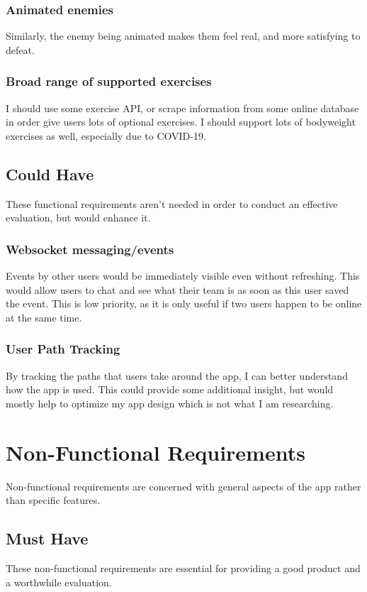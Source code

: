 \documentclass{l4proj}
\begin{document}
  \subsubsection{Animated enemies}
  Similarly, the enemy being animated makes them feel real, and more satisfying to defeat. 

  \subsubsection{Broad range of supported exercises}
  I should use some exercise API, or scrape information from some online database in order give users lots of optional exercises. I should support lots of bodyweight exercises as well, especially due to COVID-19.

\subsection{Could Have}
  These functional requirements aren't needed in order to conduct an effective evaluation, but would enhance it. 
\subsubsection{Websocket messaging/events}
  Events by other users would be immediately visible even without refreshing. This would allow users to chat and see what their team is as soon as this user saved the event. This is low priority, as it is only useful if two users happen to be online at the same time.

  \subsubsection{User Path Tracking}
  By tracking the paths that users take around the app, I can better understand how the app is used. This could provide some additional insight, but would mostly help to optimize my app design which is not what I am researching.


\section{Non-Functional Requirements}
Non-functional requirements are concerned with general aspects of the app rather than specific features.

\subsection{Must Have}
These non-functional requirements are essential for providing a good product and a worthwhile evaluation.
\end{document}
